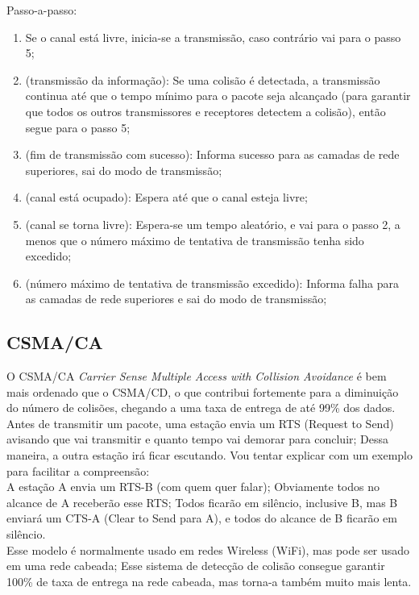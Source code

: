 \documentclass{article}
\begin{document}
Passo-a-passo:

\begin{enumerate} 
	\item Se o canal está livre, inicia-se a transmissão, caso contrário vai para o passo 5;
	\item (transmissão da informação): Se uma colisão é detectada, a
transmissão continua até que o tempo mínimo para o pacote seja alcançado (para
garantir que todos os outros transmissores e receptores detectem a colisão),
então segue para o passo 5; 
	\item (fim de transmissão com sucesso): Informa sucesso para as camadas de rede superiores, sai do modo de transmissão;
	\item (canal está ocupado): Espera até que o canal esteja livre;
	\item (canal se torna livre): Espera-se um tempo aleatório, e vai para o passo 2, a  menos que o número máximo de tentativa de transmissão tenha sido excedido;
	\item (número máximo de tentativa de transmissão excedido): Informa
falha para as camadas de rede superiores e sai do modo de transmissão;

\end{enumerate}

\subsection{CSMA/CA}
O CSMA/CA \textit{Carrier Sense Multiple Access with Collision Avoidance} é bem
mais ordenado que o CSMA/CD, o que contribui fortemente para a diminuição do
número de colisões, chegando a uma taxa de entrega de até 99\% dos dados.\\
Antes de transmitir um pacote, uma estação envia um RTS (Request to Send)
avisando que vai transmitir e quanto tempo vai demorar para concluir; Dessa
maneira, a outra estação irá ficar escutando. Vou tentar explicar com um
exemplo para facilitar a compreensão:\\
A estação A envia um RTS-B (com quem quer falar); Obviamente todos no alcance de
A receberão esse RTS; Todos ficarão em silêncio, inclusive B, mas B enviará um
CTS-A (Clear to Send para A), e todos do alcance de B ficarão em silêncio.\\
Esse modelo é normalmente usado em redes Wireless (WiFi), mas pode ser usado em
uma rede cabeada; Esse sistema de detecção de colisão consegue garantir 100\% de
taxa de entrega na rede cabeada, mas torna-a também muito mais lenta.
\end{document}
